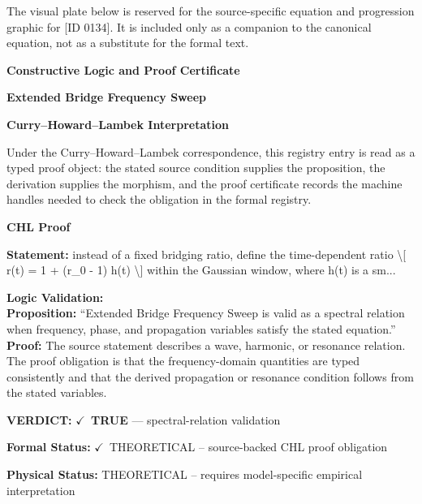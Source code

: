 \begingroup\footnotesize\sloppy
The visual plate below is reserved for the source-specific equation and progression graphic for [ID 0134]. It is included only as a companion to the canonical equation, not as a substitute for the formal text.
\par\endgroup
\ifTZPDarkEdition
{}
\fi

\clearpage
\begingroup\tzpsupportsetup
\noindent\textbf{\fontsize{10.8pt}{12.8pt}\selectfont [ID 0134] Constructive Logic and Proof Certificate}\par
\noindent\textbf{\fontsize{10pt}{12pt}\selectfont Extended Bridge Frequency Sweep}\par
\vspace{0.45em}
\begingroup
\footnotesize
\setlength{\parskip}{0.22em}
\setlength{\parindent}{0pt}
\noindent\textbf{Curry--Howard--Lambek Interpretation}\par
Under the Curry--Howard--Lambek correspondence, this registry entry is read as a typed proof
object: the stated source condition supplies the proposition, the derivation supplies the
morphism, and the proof certificate records the machine handles needed to check the obligation
in the formal registry.

\vspace{0.45em}
\noindent\textbf{CHL Proof}\par
\textbf{Statement:} instead of a fixed bridging ratio, define the time-dependent ratio \textbackslash{}[ r(t) = 1 + (r\_0 -
1) h(t) \textbackslash{}] within the Gaussian window, where h(t) is a sm...

\textbf{Logic Validation:}\\
\textbf{Proposition:} ``Extended Bridge Frequency Sweep is valid as a spectral relation when frequency, phase,
and propagation variables satisfy the stated equation.''\\
\textbf{Proof:} The source statement describes a wave, harmonic, or resonance relation. The proof
obligation is that the frequency-domain quantities are typed consistently and that the
derived propagation or resonance condition follows from the stated variables.

\textbf{VERDICT:} \ensuremath{\checkmark}\ \textbf{TRUE} --- spectral-relation validation

\textbf{Formal Status:} \ensuremath{\checkmark}\ THEORETICAL -- source-backed CHL proof obligation

\textbf{Physical Status:} THEORETICAL -- requires model-specific empirical interpretation
\par\vspace{0.45em}
\par
\ifTZPDarkEdition
{}
\fi
\endgroup
\endgroup
